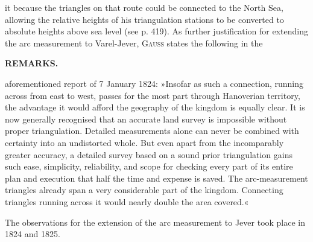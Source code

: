 it because the triangles on that route could be connected to the North Sea, allowing the relative heights of his triangulation stations to be converted to absolute heights above sea level (see p. 419). As further justification for extending the arc measurement to Varel-Jever, \textsc{Gauss} states the following in the
\par\clearpage
\noindent{}\hfill\textbf{REMARKS.}\hfill\null\par\medskip
\noindent aforementioned report of 7 January 1824: »Insofar as such a connection, running across from east to west, passes for the most part through Hanoverian territory, the advantage it would afford the geography of the kingdom is equally clear. It is now generally recognised that an accurate land survey is impossible without proper triangulation. Detailed measurements alone can never be combined with certainty into an undistorted whole. But even apart from the incomparably greater accuracy, a detailed survey based on a sound prior triangulation gains such ease, simplicity, reliability, and scope for checking every part of its entire plan and execution that half the time and expense is saved. The arc-measurement triangles already span a very considerable part of the kingdom. Connecting triangles running across it would nearly double the area covered.«

\par\noindent\hspace*{\parindent}The observations for the extension of the arc measurement to Jever took place in 1824 and 1825.

